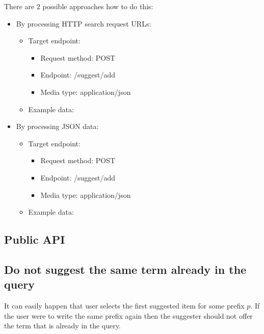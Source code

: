 There are 2 possible approaches how to do this:
\begin{itemize}
    \item By processing HTTP search request URLs:
        \begin{itemize}
            \item Target endpoint:
            \begin{itemize}
                \item Request method: POST
                \item Endpoint: /suggest/add
                \item Media type: application/json
            \end{itemize}
            \item Example data:
\begin{code}
["http://demo.opengrok.org/search?project=opengrok\&q=test"]
\end{code}
        \end{itemize}
    \item By processing JSON data:
        \begin{itemize}
            \item Target endpoint:
            \begin{itemize}
                \item Request method: POST
                \item Endpoint: /suggest/add
                \item Media type: application/json
            \end{itemize}
            \item Example data:
\begin{code}
\end{code}
        \end{itemize}
\end{itemize}

\subsection{Public API}


\subsection{Do not suggest the same term already in the query}
It can easily happen that user selects the first suggested item for some prefix $p$. If the user were to write the same
prefix again then the suggester should not offer the term that is already in the query.

